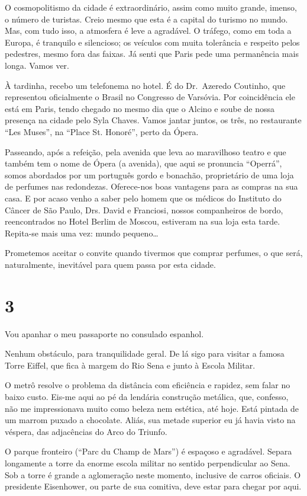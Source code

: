 O cosmopolitismo da cidade é extraordinário, assim como muito grande, imenso, o número de turistas. Creio mesmo que esta é a capital do turismo no mundo. Mas, com tudo isso, a atmosfera é leve a agradável. O tráfego, como em toda a Europa, é tranquilo e silencioso; os veículos com muita tolerância e respeito pelos pedestres, mesmo fora das faixas. Já senti que Paris pede uma permanência mais longa. Vamos ver.

À tardinha, recebo um telefonema no hotel. É do Dr.~Azeredo Coutinho, que representou oficialmente o Brasil no Congresso de Varsóvia. Por coincidência ele está em Paris, tendo chegado no mesmo dia que o Alcino e soube de nossa presença na cidade pelo Syla Chaves. Vamos jantar juntos, os três, no restaurante ``Les Muses'', na ``Place St. Honoré'', perto da Ópera.

Passeando, após a refeição, pela avenida que leva ao maravilhoso teatro e que também tem o nome de Ópera (a avenida), que aqui se pronuncia ``Operrá'', somos abordados por um português gordo e bonachão, proprietário de uma loja de perfumes nas redondezas. Oferece-nos boas vantagens para as compras na sua casa. E por acaso venho a saber pelo homem que os médicos do Instituto do Câncer de São Paulo, Drs. David e Franciosi, nossos companheiros de bordo, reencontrados no Hotel Berlim de Moscou, estiveram na sua loja esta tarde. Repita-se mais uma vez: mundo pequeno\ldots

Prometemos aceitar o convite quando tivermos que comprar perfumes, o que será, naturalmente, inevitável para quem passa por esta cidade.

\section*{3 \adfflatleafright {}}
Vou apanhar o meu passaporte no consulado espanhol.

Nenhum obstáculo, para tranquilidade geral. De lá sigo para visitar a famosa Torre Eiffel, que fica à margem do Rio Sena e junto à Escola Militar.

O metrô resolve o problema da distância com eficiência e rapidez, sem falar no baixo custo. Eis-me aqui ao pé da lendária construção metálica, que, confesso, não me impressionava muito como beleza nem estética, até hoje. Está pintada de um marrom puxado a chocolate. Aliás, sua metade superior eu já havia visto na véspera, das adjacências do Arco do Triunfo.

O parque fronteiro (``Parc du Champ de Mars'') é espaçoso e agradável. Separa longamente a torre da enorme escola militar no sentido perpendicular ao Sena. Sob a torre é grande a aglomeração neste momento, inclusive de carros oficiais. O presidente Eisenhower, ou parte de sua comitiva, deve estar para chegar por aqui.

